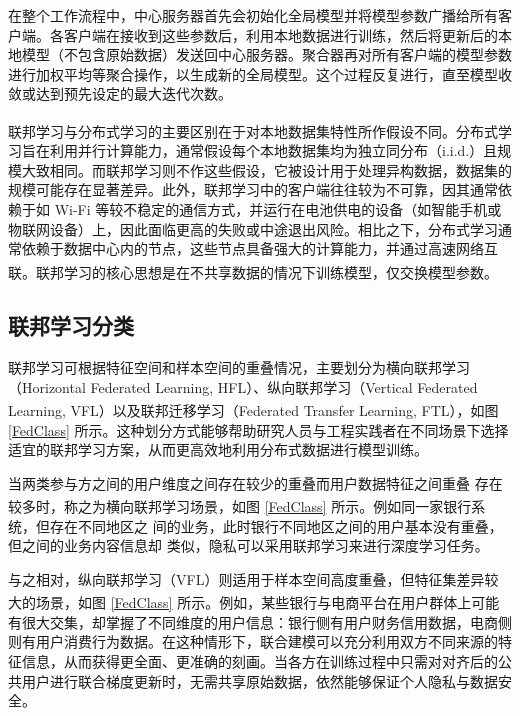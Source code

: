 在整个工作流程中，中心服务器首先会初始化全局模型并将模型参数广播给所有客户端。各客户端在接收到这些参数后，利用本地数据进行训练，然后将更新后的本地模型（不包含原始数据）发送回中心服务器。聚合器再对所有客户端的模型参数进行加权平均等聚合操作，以生成新的全局模型。这个过程反复进行，直至模型收敛或达到预先设定的最大迭代次数。

联邦学习与分布式学习的主要区别在于对本地数据集特性所作假设不同\textsuperscript{\cite{konevcny2015federated}}。分布式学习旨在利用并行计算能力，通常假设每个本地数据集均为独立同分布（i.i.d.）且规模大致相同。而联邦学习则不作这些假设，它被设计用于处理异构数据，数据集的规模可能存在显著差异。此外，联邦学习中的客户端往往较为不可靠，因其通常依赖于如 Wi-Fi 等较不稳定的通信方式，并运行在电池供电的设备（如智能手机或物联网设备）上，因此面临更高的失败或中途退出风险。相比之下，分布式学习通常依赖于数据中心内的节点，这些节点具备强大的计算能力，并通过高速网络互联\textsuperscript{\cite{kairouz2021advances}}。联邦学习的核心思想是在不共享数据的情况下训练模型，仅交换模型参数。

\subsection{联邦学习分类}
联邦学习可根据特征空间和样本空间的重叠情况，主要划分为横向联邦学习（Horizontal Federated Learning, HFL）、纵向联邦学习（Vertical Federated Learning, VFL）以及联邦迁移学习（Federated Transfer Learning, FTL）\textsuperscript{\cite{yang2019federated,li2020federated}}，如图 \ref{FedClass} 所示。这种划分方式能够帮助研究人员与工程实践者在不同场景下选择适宜的联邦学习方案，从而更高效地利用分布式数据进行模型训练。

当两类参与方之间的用户维度之间存在较少的重叠而用户数据特征之间重叠 存在较多时，称之为横向联邦学习场景\textsuperscript{\cite{yang2019federated,liu2019communication}}，如图 \ref{FedClass} 所示。例如同一家银行系统，但存在不同地区之 间的业务，此时银行不同地区之间的用户基本没有重叠，但之间的业务内容信息却 类似，隐私可以采用联邦学习来进行深度学习任务。

与之相对，纵向联邦学习（VFL）则适用于样本空间高度重叠，但特征集差异较大的场景\textsuperscript{\cite{liu2020secure,chen2020vafl}}，如图 \ref{FedClass} 所示。例如，某些银行与电商平台在用户群体上可能有很大交集，却掌握了不同维度的用户信息：银行侧有用户财务信用数据，电商侧则有用户消费行为数据。在这种情形下，联合建模可以充分利用双方不同来源的特征信息，从而获得更全面、更准确的刻画。当各方在训练过程中只需对对齐后的公共用户进行联合梯度更新时，无需共享原始数据，依然能够保证个人隐私与数据安全。

